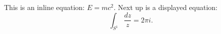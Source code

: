 \documentclass{article}
\begin{document}
This is an inline equation: $E = mc^2$. Next up is a displayed equation:
\[ \int_{S^1} \frac{dz}{z} = 2 \pi i. \]
\end{document}
